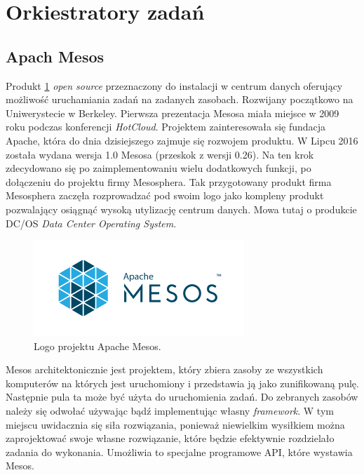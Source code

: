 \documentclass[10pt,a4paper,titlepage,twoside]{report}
\begin{document}
\newpage

\section{Orkiestratory zadań}

\subsection{Apach Mesos}

Produkt \cite{ad34} \ref{mesos_logo} \textit{open source} przeznaczony do instalacji w centrum danych oferujący możliwość uruchamiania zadań na zadanych zasobach. Rozwijany początkowo na Uniwerystecie w Berkeley. Pierwsza prezentacja Mesosa miała miejsce w 2009 roku podczas konferencji \textit{HotCloud}. Projektem zainteresowała się fundacja Apache, która do dnia dzisiejszego zajmuje się rozwojem produktu. W Lipcu 2016 została wydana wersja 1.0 Mesosa (przeskok z wersji 0.26). Na ten krok zdecydowano się po zaimplementowaniu wielu dodatkowych funkcji, po dołączeniu do projektu firmy Mesosphera. Tak przygotowany produkt firma Mesosphera zaczęła rozprowadzać pod swoim logo jako kompleny produkt pozwalający osiągnąć wysoką utylizację centrum danych. Mowa tutaj o produkcie DC/OS \textit{Data Center Operating System}. 

\begin{figure}[!h]
	\centering
	\includegraphics[scale=1]{pics/apache_mesos_logo.png}
	\caption{Logo projektu Apache Mesos.}
	\label{mesos_logo}
\end{figure}

Mesos architektonicznie \cite{ad33} jest projektem, który zbiera zasoby ze wszystkich komputerów na których jest uruchomiony i przedstawia ją jako zunifikowaną pulę. Następnie pula ta może być użyta do uruchomienia zadań. Do zebranych zasobów należy się odwołać używając bądź implementując własny \textit{framework}. W tym miejscu uwidacznia się siła rozwiązania, ponieważ niewielkim wysiłkiem można zaprojektować swoje własne rozwiązanie, które będzie efektywnie rozdzielało zadania do wykonania. Umożliwia to specjalne programowe API, które wystawia Mesos.
\end{document}
